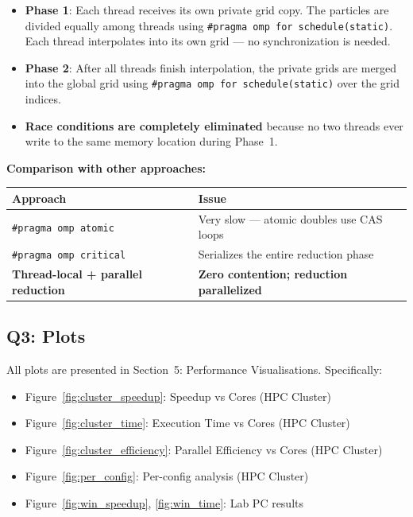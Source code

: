 \documentclass[12pt,a4paper]{article}
\begin{document}
\begin{itemize}
    \item \textbf{Phase 1}: Each thread receives its own private grid copy. The particles are divided equally among threads using \texttt{\#pragma omp for schedule(static)}. Each thread interpolates into its own grid --- no synchronization is needed.
    
    \item \textbf{Phase 2}: After all threads finish interpolation, the private grids are merged into the global grid using \texttt{\#pragma omp for schedule(static)} over the grid indices.
    
    \item \textbf{Race conditions are completely eliminated} because no two threads ever write to the same memory location during Phase~1.
\end{itemize}

\textbf{Comparison with other approaches:}

\begin{table}[H]
\centering
\begin{tabular}{ll}
\toprule
\textbf{Approach} & \textbf{Issue} \\
\midrule
\texttt{\#pragma omp atomic} & Very slow --- atomic doubles use CAS loops \\
\texttt{\#pragma omp critical} & Serializes the entire reduction phase \\
\textbf{Thread-local + parallel reduction} & \textbf{Zero contention; reduction parallelized} \\
\bottomrule
\end{tabular}
\end{table}

\subsection{Q3: Plots}

All plots are presented in Section~5: Performance Visualisations. Specifically:
\begin{itemize}
    \item Figure~\ref{fig:cluster_speedup}: Speedup vs Cores (HPC Cluster)
    \item Figure~\ref{fig:cluster_time}: Execution Time vs Cores (HPC Cluster)
    \item Figure~\ref{fig:cluster_efficiency}: Parallel Efficiency vs Cores (HPC Cluster)
    \item Figure~\ref{fig:per_config}: Per-config analysis (HPC Cluster)
    \item Figure~\ref{fig:win_speedup}, \ref{fig:win_time}: Lab PC results
\end{itemize}
\end{document}
